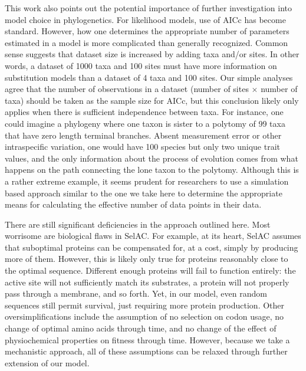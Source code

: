 \documentclass[12pt,letterpaper]{article}
\newcommand{\selac}{SelAC\xspace}
\begin{document}
This work also points out the potential importance of further investigation into model choice in phylogenetics. 
For likelihood models, use of AICc has become standard. 
However, how one determines the appropriate number of parameters estimated in a model is more complicated than generally recognized. 
Common sense suggests that dataset size is increased by adding taxa and/or sites. 
In other words, a dataset of 1000 taxa and 100 sites must have more information on substitution models than a dataset of 4 taxa and 100 sites. 
Our simple analyses agree that the number of observations in a dataset (number of sites $\times$ number of taxa) should be taken as the sample size for AICc, but this conclusion likely only applies when there is sufficient independence between taxa. 
For instance, one could imagine a phylogeny where one taxon is sister to a polytomy of 99 taxa that have zero length terminal branches. 
Absent measurement error or other intraspecific variation, one would have 100 species but only two unique trait values, and the only information about the process of evolution comes from what happens on the path connecting the lone taxon to the polytomy. 
Although this is a rather extreme example, it seems prudent for researchers to use a simulation based approach similar to the one we take here to determine the appropriate means for calculating the effective number of data points in their data.

There are still significant deficiencies in the approach outlined here. 
Most worrisome are biological flaws in \selac.
For example, at its heart, \selac assumes that suboptimal proteins can be compensated for, at a cost, simply by producing more of them. 
However, this is likely only true for proteins reasonably close to the optimal sequence. 
Different enough proteins will fail to function entirely: the active site will not sufficiently match its substrates, a protein will not properly pass through a membrane, and so forth. 
Yet, in our model, even random sequences still permit survival, just requiring more protein production. 
Other oversimplifications include the assumption of no selection on codon usage, no change of optimal amino acids through time, and no change of the effect of physiochemical properties on fitness through time.
However, because we take a mechanistic approach, all of these assumptions can be relaxed through further extension of our model. 
\end{document}
